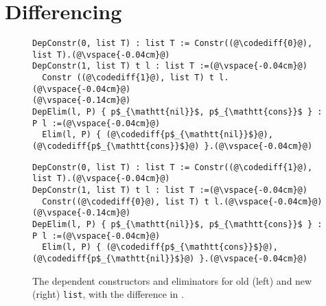 \section{Differencing}
\label{sec:pi-diff}


\begin{figure*}
\begin{minipage}{0.48\textwidth}
\begin{lstlisting}
DepConstr(0, list T) : list T := Constr((@\codediff{0}@), list T).(@\vspace{-0.04cm}@)
DepConstr(1, list T) t l : list T :=(@\vspace{-0.04cm}@)
  Constr ((@\codediff{1}@), list T) t l.(@\vspace{-0.04cm}@)
(@\vspace{-0.14cm}@)
DepElim(l, P) { p$_{\mathtt{nil}}$, p$_{\mathtt{cons}}$ } : P l :=(@\vspace{-0.04cm}@)
  Elim(l, P) { (@\codediff{p$_{\mathtt{nil}}$}@), (@\codediff{p$_{\mathtt{cons}}$}@) }.(@\vspace{-0.04cm}@)
\end{lstlisting}
\end{minipage}
\hfill
\begin{minipage}{0.48\textwidth}
\begin{lstlisting}
DepConstr(0, list T) : list T := Constr((@\codediff{1}@), list T).(@\vspace{-0.04cm}@)
DepConstr(1, list T) t l : list T :=(@\vspace{-0.04cm}@)
  Constr((@\codediff{0}@), list T) t l.(@\vspace{-0.04cm}@)
(@\vspace{-0.14cm}@)
DepElim(l, P) { p$_{\mathtt{nil}}$, p$_{\mathtt{cons}}$ } : P l :=(@\vspace{-0.04cm}@)
  Elim(l, P) { (@\codediff{p$_{\mathtt{cons}}$}@), (@\codediff{p$_{\mathtt{nil}}$}@) }.(@\vspace{-0.04cm}@)
\end{lstlisting}
\end{minipage}
\vspace{-0.3cm}
\caption{The dependent constructors and eliminators for old (left) and new (right) \lstinline{list}, with the difference in .}
\vspace{-0.1cm}
\label{fig:listconfig}
\end{figure*}

